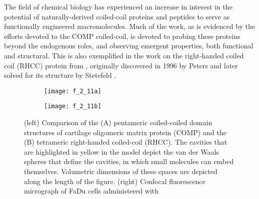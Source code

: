 \begin{refsection}
The field of chemical biology has experienced an increase in interest in the
potential of naturally-derived coiled-coil proteins and peptides to serve as
functionally engineered macromolecules. Much of the work, as is evidenced by the
efforts devoted to the COMP coiled-coil, is devoted to probing these proteins
beyond the endogenous roles, and observing emergent properties, both functional
and structural. This is also exemplified in the work on the right-handed coiled
coil (RHCC) protein from , originally discovered
in 1996 by Peters  and later solved for its structure by Stetefeld
.\cite{Peters1996,Stetefeld2000} 
\begin{figure}[h!]
    \centering
    \begin{subfigure}[b]{0.45\textwidth}
        \texttt{[image: f\_2\_11a]}
        \label{fig:coil_comparison}
    \end{subfigure}
    \begin{subfigure}[b]{0.45\textwidth}
        \texttt{[image: f\_2\_11b]}
        \label{fig:coil_localization}
    \end{subfigure}
    \caption[(left) Comparison of the (A) pentameric coiled-coiled domain
        structures of cartilage oligomeric matrix protein (COMP) and the
        (B) tetrameric right-handed coiled-coil (RHCC). The cavities that are
        highlighted in yellow in the model depict the van der Waals spheres that
        define the cavities, in which small molecules can embed themselves.
        Volumetric dimensions of these spaces are depicted along the length of
        the figure.\cite{McFarlane2009}
        (right) Confocal fluorescence micrograph of FaDu cells administered with
        RHCC, conjugated to Alexa Fluor 488 SDP, after incubation or 8 h at
        \SI{37}{\celsius}, collected by Eriksson. Blue channel assigned to
        DAPI-staining of nuclear DNA. Green channel assigned to dye-conjugated
        RHCC.\cite{Eriksson2009}]{(left) Comparison of the (A) pentameric coiled-coiled domain
        structures of cartilage oligomeric matrix protein (COMP) and the
        (B) tetrameric right-handed coiled-coil (RHCC). The cavities that are
        highlighted in yellow in the model depict the van der Waals spheres that
        define the cavities, in which small molecules can embed themselves.
        Volumetric dimensions of these spaces are depicted along the length of
        the figure.\cite{McFarlane2009}
        (right) Confocal fluorescence micrograph of FaDu cells administered with
}
\end{figure}
\end{refsection}
